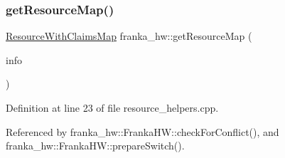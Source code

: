 \subsubsection{\texorpdfstring{get\+Resource\+Map()}{getResourceMap()}}
{\footnotesize\ttfamily \hyperlink{namespacefranka__hw_a1fae0c56c9a08fdeb137e601f876cc77}{Resource\+With\+Claims\+Map} franka\+\_\+hw\+::get\+Resource\+Map (\begin{DoxyParamCaption}\item[{const std\+::list$<$ hardware\+\_\+interface\+::\+Controller\+Info $>$ \&}]{info }\end{DoxyParamCaption})}



Definition at line 23 of file resource\+\_\+helpers.\+cpp.



Referenced by franka\+\_\+hw\+::\+Franka\+H\+W\+::check\+For\+Conflict(), and franka\+\_\+hw\+::\+Franka\+H\+W\+::prepare\+Switch().


